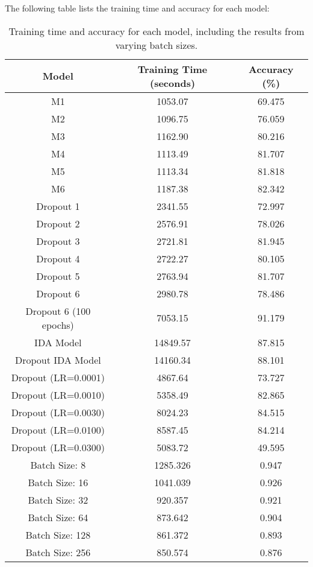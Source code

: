 \documentclass{article}
\begin{document}
The following table lists the training time and accuracy for each model:

\begin{table}[h!]
\begin{center}
\begin{tabular}{|c|c|c|}
\hline
Model & Training Time (seconds) & Accuracy (\%)\\
\hline
M1 & 1053.07 & 69.475\\
M2 & 1096.75 & 76.059\\
M3 & 1162.90 & 80.216\\
M4 & 1113.49 & 81.707\\
M5 & 1113.34 & 81.818\\
M6 & 1187.38 & 82.342\\
Dropout 1 & 2341.55 & 72.997\\
Dropout 2 & 2576.91 & 78.026\\
Dropout 3 & 2721.81 & 81.945\\
Dropout 4 & 2722.27 & 80.105\\
Dropout 5 & 2763.94 & 81.707\\
Dropout 6 & 2980.78 & 78.486\\
Dropout 6 (100 epochs) & 7053.15 & 91.179\\
IDA Model & 14849.57 & 87.815\\
Dropout IDA Model & 14160.34 & 88.101\\
Dropout (LR=0.0001) & 4867.64 & 73.727\\
Dropout (LR=0.0010) & 5358.49 & 82.865\\
Dropout (LR=0.0030) & 8024.23 & 84.515\\
Dropout (LR=0.0100) & 8587.45 & 84.214\\
Dropout (LR=0.0300) & 5083.72 & 49.595\\
Batch Size: 8 & 1285.326 & 0.947 \\
Batch Size: 16 & 1041.039 & 0.926 \\
Batch Size: 32 & 920.357 & 0.921 \\
Batch Size: 64 & 873.642 & 0.904 \\
Batch Size: 128 & 861.372 & 0.893 \\
Batch Size: 256 & 850.574 & 0.876 \\
\hline
\end{tabular}
\end{center}
\caption{Training time and accuracy for each model, including the results from varying batch sizes.}
\end{table}
\end{document}
